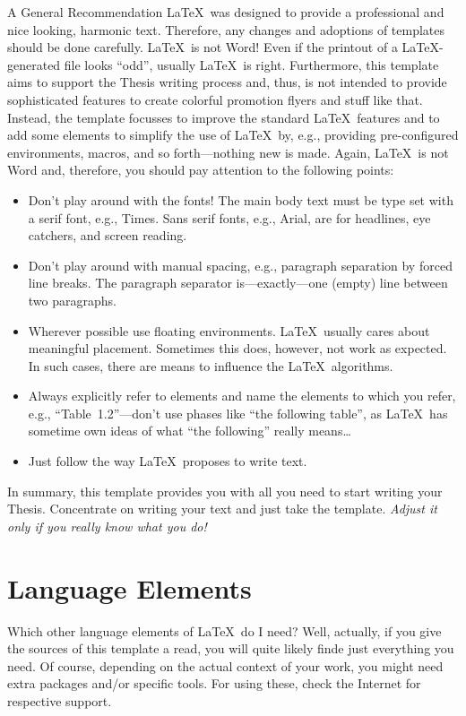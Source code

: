 \begin{MyBox}{A General Recommendation}
	\LaTeX\ was designed to provide a professional and nice looking, harmonic text. Therefore, any changes and adoptions of templates should be done carefully. \LaTeX\ is not Word! Even if the printout of a \LaTeX-generated file looks ``odd'', usually \LaTeX\ is right. Furthermore, this template aims to support the Thesis writing process and, thus, is not intended to provide sophisticated features to create colorful promotion flyers and stuff like that. Instead, the template focusses to improve the standard \LaTeX\ features and to add some elements to simplify the use of \LaTeX\ by, e.g., providing pre-configured environments, macros, and so forth---nothing new is made. Again, \LaTeX\ is not Word and, therefore, you should pay attention to the following points:
	\begin{itemize}
		\item Don't play around with the fonts! The main body text must be type set with a serif font, e.g., Times. Sans serif fonts, e.g., Arial, are for headlines, eye catchers, and screen reading. 
		\item Don't play around with manual spacing, e.g., paragraph separation by forced line breaks. The paragraph separator is---exactly---one (empty) line between two paragraphs.
		\item Wherever possible use floating environments. \LaTeX\ usually cares about meaningful placement. Sometimes this does, however, not work as expected. In such cases, there are means to influence the \LaTeX\ algorithms.
		\item Always explicitly refer to elements and name the elements to which you refer, e.g., ``Table~1.2''---don't use phases like ``the following table'', as \LaTeX\ has sometime own ideas of what ``the following'' really means\ldots
		\item Just follow the way \LaTeX\ proposes to write text.
	\end{itemize}
	In summary, this template provides you with all you need to start writing your Thesis. Concentrate on writing your text and just take the template. \emph{Adjust it only if you really know what you do!}
\end{MyBox}

\section{Language Elements}
\label{sec:LanguageElements}
Which other language elements of \LaTeX\ do I need? Well, actually, if you give the sources of this template a read, you will quite likely finde just everything you need. Of course, depending on the actual context of your work, you might need extra packages and/or specific tools. For using these, check the Internet for respective support.


